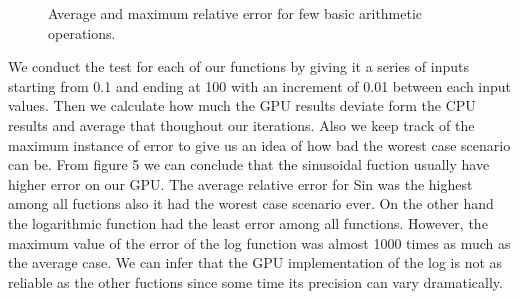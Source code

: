 \begin{figure}[!tbh]
 \centering  
  \caption{Average and maximum relative error for few basic arithmetic operations.}
   \label{fig:histogram_comparison}
\end{figure} 

We conduct the test for each of our functions by giving it a series of inputs starting from 0.1 and ending at 100 with an increment of 0.01 between each input values. Then we calculate how much the GPU results deviate form the CPU results and average that thoughout our iterations. Also we keep track of the maximum instance of error to give us an idea of how bad the worest case scenario can be. From figure 5 we can conclude that the sinusoidal fuction usually have higher error on our GPU. The average relative error for Sin was the highest among all fuctions also it had the worest case scenario ever. On the other hand the logarithmic function had the least error among all functions. However, the maximum value of the error of the log function was almost 1000 times as much as the average case. We can infer that the GPU implementation of the log is not as reliable as the other fuctions since some time its precision can vary dramatically.

